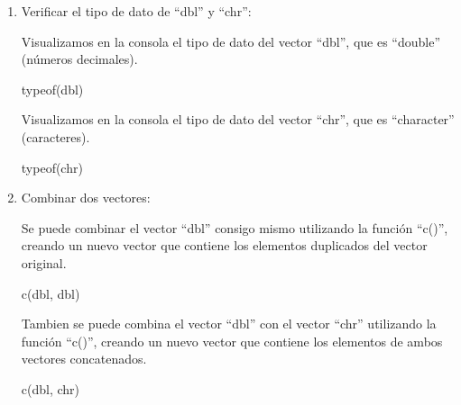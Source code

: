 \documentclass[
  jou,
  floatsintext,
  longtable,
  a4paper,
  nolmodern,
  notxfonts,
  notimes,
  12pt,
  colorlinks=true,linkcolor=blue,citecolor=blue,urlcolor=blue]{apa7}
\newenvironment{Shaded}{\begin{snugshade}}{\end{snugshade}}
\newcommand{\FunctionTok}[1]{\textcolor[rgb]{0.28,0.35,0.67}{#1}}
\newcommand{\NormalTok}[1]{\textcolor[rgb]{0.00,0.23,0.31}{#1}}
\begin{document}
\begin{enumerate}
  Calculamos y mostramos en la consola la longitud del vector ``chr'',
  que es 3.

\begin{Shaded}
\begin{Highlighting}[]
\FunctionTok{length}\NormalTok{(chr)}
\end{Highlighting}
\end{Shaded}
\item
  Verificar el tipo de dato de ``dbl'' y ``chr'':

  Visualizamos en la consola el tipo de dato del vector ``dbl'', que es
  ``double'' (números decimales).

\begin{Shaded}
\begin{Highlighting}[]
\FunctionTok{typeof}\NormalTok{(dbl)}
\end{Highlighting}
\end{Shaded}

  Visualizamos en la consola el tipo de dato del vector ``chr'', que es
  ``character'' (caracteres).

\begin{Shaded}
\begin{Highlighting}[]
\FunctionTok{typeof}\NormalTok{(chr)}
\end{Highlighting}
\end{Shaded}
\item
  Combinar dos vectores:

  Se puede combinar el vector ``dbl'' consigo mismo utilizando la
  función ``c()'', creando un nuevo vector que contiene los elementos
  duplicados del vector original.

\begin{Shaded}
\begin{Highlighting}[]
\FunctionTok{c}\NormalTok{(dbl, dbl)}
\end{Highlighting}
\end{Shaded}

  Tambien se puede combina el vector ``dbl'' con el vector ``chr''
  utilizando la función ``c()'', creando un nuevo vector que contiene
  los elementos de ambos vectores concatenados.

\begin{Shaded}
\begin{Highlighting}[]
\FunctionTok{c}\NormalTok{(dbl, chr)}
\end{Highlighting}
\end{Shaded}
\end{enumerate}
\end{document}
